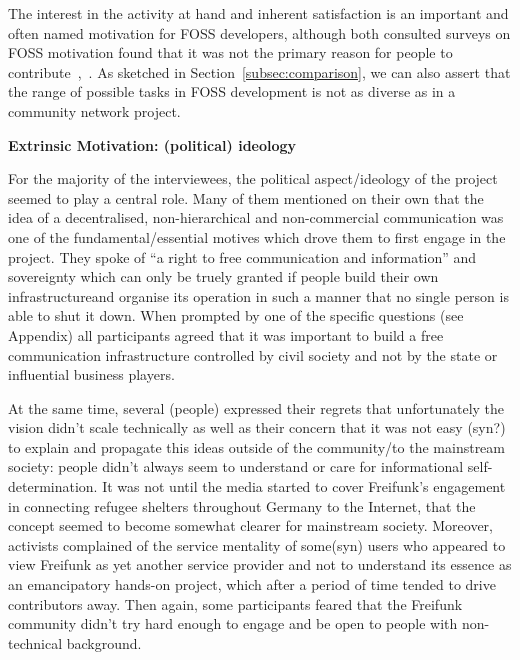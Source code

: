 The interest in the activity at hand and inherent satisfaction is an important and often named motivation for FOSS developers, although both consulted surveys on FOSS motivation found that it was not the primary reason for people to contribute~\cite{HarOu2002},~\cite{LakWo2005}.
As sketched in Section~\ref{subsec:comparison}, we can also assert that the range of possible tasks in FOSS development is not as diverse as in a community network project.

\textbf{Extrinsic Motivation: (political) ideology}

For the majority of the interviewees, the political aspect/ideology of the project seemed to play a central role.
Many of them mentioned on their own that the idea of a decentralised, non-hierarchical and non-commercial communication was one of the fundamental/essential motives which drove them to first engage in the project.
They spoke of ``a right to free communication and information'' and sovereignty which can only be truely granted if people build their own infrastructureand organise its operation in such a manner that no single person is able to shut it down.
When prompted by one of the specific questions (see Appendix) all participants agreed that it was important to build a free communication infrastructure controlled by civil society and not by the state or influential business players.

At the same time, several (people) expressed their regrets that unfortunately the vision didn't scale technically as well as their concern that it was not easy (syn?) to explain and propagate this ideas outside of the community/to the mainstream society: people didn't always seem to understand or care for informational self-determination.
It was not until the media started to cover Freifunk's engagement in connecting refugee shelters throughout Germany to the Internet, that the concept seemed to become somewhat clearer for mainstream society.
Moreover, activists complained of the service mentality of some(syn) users who appeared to view Freifunk as yet another service provider and not to understand its essence as an emancipatory hands-on project, which after a period of time tended to drive contributors away.
Then again, some participants feared that the Freifunk community didn't try hard enough to engage and be open to people with non-technical background.

